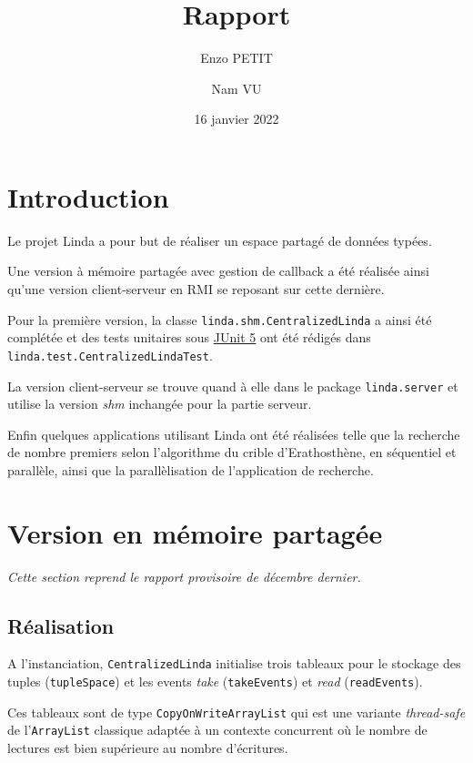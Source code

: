 \documentclass[headings=standardclasses,parskip=half]{scrartcl}
\title{Rapport}
\subtitle{}
\author{Enzo PETIT \and Nam VU}
\date{16 janvier 2022}
\begin{document}
\maketitle

\newpage

\tableofcontents

\newpage

\section{Introduction}

Le projet Linda a pour but de réaliser un espace partagé de données
typées.

Une version à mémoire partagée avec gestion de callback a été réalisée
ainsi qu'une version client-serveur en RMI se reposant sur cette dernière.

Pour la première version, la classe \texttt{linda.shm.CentralizedLinda}
a ainsi été complétée et des tests unitaires sous
\href{https://junit.org/junit5/}{JUnit 5}
ont été rédigés dans \texttt{linda.test.CentralizedLindaTest}.

La version client-serveur se trouve quand à elle dans le package
\texttt{linda.server} et utilise la version \textit{shm} inchangée pour
la partie serveur.

Enfin quelques applications utilisant Linda ont été réalisées
telle que la recherche de nombre premiers selon l'algorithme du
crible d'Erathosthène, en séquentiel et parallèle, ainsi que la
parallèlisation de l'application de recherche.

\section{Version en mémoire partagée}

\textit{Cette section reprend le rapport provisoire de décembre dernier.}

\subsection{Réalisation}

A l'instanciation, \texttt{CentralizedLinda} initialise trois tableaux
pour le stockage des tuples (\texttt{tupleSpace}) et les events
\emph{take} (\texttt{takeEvents}) et \emph{read} (\texttt{readEvents}).

Ces tableaux sont de type \texttt{CopyOnWriteArrayList} qui est une
variante \emph{thread-safe} de l'\texttt{ArrayList} classique adaptée
à un contexte concurrent où le nombre de lectures est bien supérieure
au nombre d'écritures.
\end{document}
